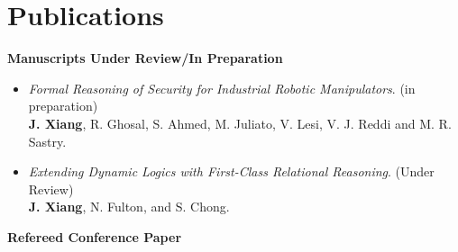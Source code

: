 \documentclass[11pt]{article}
\begin{document}


\section{Publications}


\textbf{Manuscripts Under Review/In Preparation}

\begin{itemize}
\item \textit{Formal Reasoning of Security for Industrial Robotic
Manipulators}. (in preparation) \\
\textbf{J. Xiang}, R. Ghosal, S. Ahmed, M. Juliato, V. Lesi, V. J. Reddi and M. R. Sastry. 
%
\item \textit{Extending Dynamic Logics with First-Class Relational Reasoning}. (Under Review) \\
\textbf{J. Xiang}, N. Fulton, and S. Chong. 
\end{itemize}

\textbf{Refereed Conference Paper}
\end{document}
